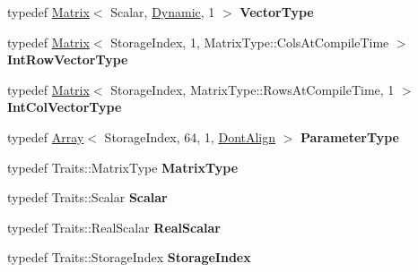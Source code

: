 \begin{DoxyCompactItemize}
typedef \hyperlink{group___core___module_class_eigen_1_1_matrix}{Matrix}$<$ Scalar, \hyperlink{namespace_eigen_ad81fa7195215a0ce30017dfac309f0b2}{Dynamic}, 1 $>$ {\bfseries Vector\+Type}
\item 
\mbox{\label{class_eigen_1_1_pardiso_impl_a90be930fec075f5fd78b9082f720d56b}} 
typedef \hyperlink{group___core___module_class_eigen_1_1_matrix}{Matrix}$<$ Storage\+Index, 1, Matrix\+Type\+::\+Cols\+At\+Compile\+Time $>$ {\bfseries Int\+Row\+Vector\+Type}
\item 
\mbox{\label{class_eigen_1_1_pardiso_impl_a11e6b204912c77d1eceeb05f712b946b}} 
typedef \hyperlink{group___core___module_class_eigen_1_1_matrix}{Matrix}$<$ Storage\+Index, Matrix\+Type\+::\+Rows\+At\+Compile\+Time, 1 $>$ {\bfseries Int\+Col\+Vector\+Type}
\item 
\mbox{\label{class_eigen_1_1_pardiso_impl_a5b0f199e9396b2aaac3bf80d34ac10ec}} 
typedef \hyperlink{group___core___module_class_eigen_1_1_array}{Array}$<$ Storage\+Index, 64, 1, \hyperlink{group__enums_ggaacded1a18ae58b0f554751f6cdf9eb13a40a452614141522dd313363dbbd65726}{Dont\+Align} $>$ {\bfseries Parameter\+Type}
\item 
\mbox{\label{class_eigen_1_1_pardiso_impl_a2f2436d02c24adffa86fd417ce12b7c3}} 
typedef Traits\+::\+Matrix\+Type {\bfseries Matrix\+Type}
\item 
\mbox{\label{class_eigen_1_1_pardiso_impl_ae546657194f55140629bac75a8619769}} 
typedef Traits\+::\+Scalar {\bfseries Scalar}
\item 
\mbox{\label{class_eigen_1_1_pardiso_impl_a4a4dfb3a20c538cd373f4b62de9c5fed}} 
typedef Traits\+::\+Real\+Scalar {\bfseries Real\+Scalar}
\item 
\mbox{\label{class_eigen_1_1_pardiso_impl_a234a0c3536cccbeabcfe9ed8376a3691}} 
typedef Traits\+::\+Storage\+Index {\bfseries Storage\+Index}
\item 
\mbox{\label{class_eigen_1_1_pardiso_impl_a970eeb6d1193e63762adb8c7a06df581}} 

\end{DoxyCompactItemize}
